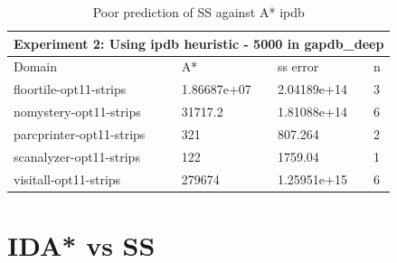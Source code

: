\documentclass[a4paper,12pt]{article}
\begin{document}
\begin{table}[htb]
\centering
\caption{Poor prediction of SS against A* ipdb}
\label{my-label}
\begin{tabular}{l|l|l|l}
\hline
\multicolumn{4}{l}{Experiment 2: Using ipdb heuristic - 5000 in gapdb\_deep} \\ \hline
Domain& A*& ss error& n \\ \hline
floortile-opt11-strips& 1.86687e+07& 2.04189e+14& 3\\ \hline
nomystery-opt11-strips& 31717.2& 1.81088e+14& 6\\ \hline
parcprinter-opt11-strips& 321& 807.264& 2\\ \hline
scanalyzer-opt11-strips& 122& 1759.04& 1\\ \hline
visitall-opt11-strips& 279674& 1.25951e+15& 6\\ \hline
\end{tabular}
\end{table}

\section{IDA* vs SS}
\end{document}
